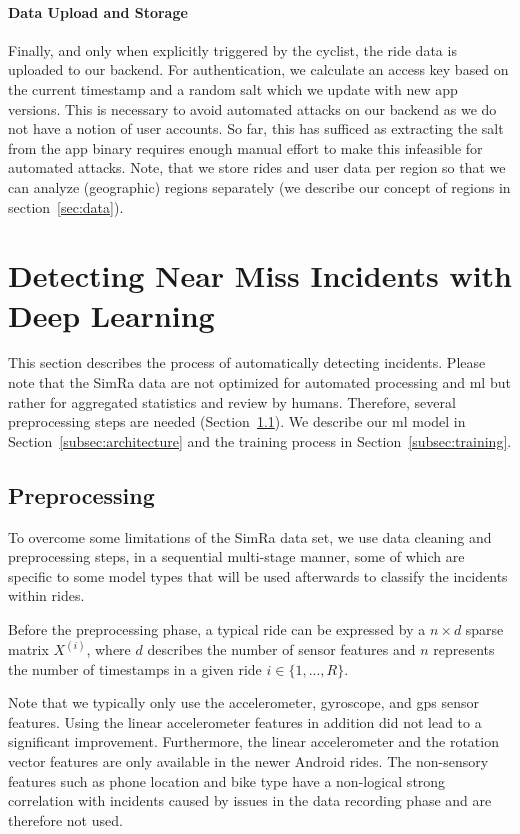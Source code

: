 \paragraph{Data Upload and Storage}
Finally, and only when explicitly triggered by the cyclist, the ride data is uploaded to our backend.
For authentication, we calculate an access key based on the current timestamp and a random salt which we update with new app versions.
This is necessary to avoid automated attacks on our backend as we do not have a notion of user accounts.
So far, this has sufficed as extracting the salt from the app binary requires enough manual effort to make this infeasible for automated attacks.
Note, that we store rides and user data per region so that we can analyze (geographic) regions separately (we describe our concept of regions in section~\ref{sec:data}).


\section{Detecting Near Miss Incidents with Deep Learning}
\label{sec:detecting_near_miss_incidents}
This section describes the process of automatically detecting incidents. 
Please note that the SimRa data are not optimized for automated processing and \ac{ml} but rather for aggregated statistics and review by humans.
Therefore, several preprocessing steps are needed (Section~\ref{subsec:preprocessing}).
We describe our \ac{ml} model in Section~\ref{subsec:architecture} and the training process in Section~\ref{subsec:training}.


\subsection{Preprocessing}
\label{subsec:preprocessing}
To overcome some limitations of the SimRa data set, we use data cleaning and preprocessing steps, in a sequential multi-stage manner,  some of which are specific to some model types that will be used afterwards to classify the incidents within rides.

Before the preprocessing phase, a typical ride can be expressed by a $n \times d$ sparse matrix $X^{(i)}$, where $d$ describes the number of sensor features and $n$ represents the number of timestamps in a given ride $i \in \{1,...,R\}$.

Note that we typically only use the accelerometer, gyroscope, and \ac{gps} sensor features.
Using the linear accelerometer features in addition did not lead to a significant improvement.
Furthermore, the linear accelerometer and the rotation vector features are only available in the newer Android rides.
The non-sensory features such as phone location and bike type have a non-logical strong correlation with incidents caused by issues in the data recording phase and are therefore not used.

